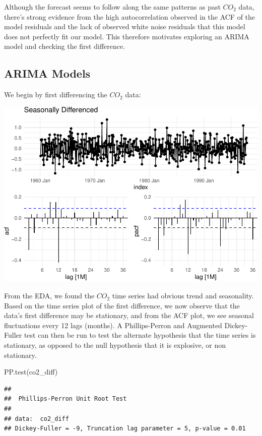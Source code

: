\documentclass[AER]{AEA}
\newenvironment{Shaded}{\begin{snugshade}}{\end{snugshade}}
\newcommand{\FunctionTok}[1]{\textcolor[rgb]{0.00,0.00,0.00}{#1}}
\newcommand{\NormalTok}[1]{#1}
\begin{document}
Although the forecast seems to follow along the same patterns as past
\(CO_2\) data, there's strong evidence from the high autocorrelation
observed in the ACF of the model residuals and the lack of observed
white noise residuals that this model does not perfectly fit our model.
This therefore motivates exploring an ARIMA model and checking the first
difference.

\hypertarget{arima-models}{%
\subsection{ARIMA Models}\label{arima-models}}

We begin by first differencing the \(CO_2\) data:

\includegraphics{co2_1997_Qian_files/figure-latex/unnamed-chunk-2-1.pdf}

From the EDA, we found the \(CO_2\) time series had obvious trend and
seasonality. Based on the time series plot of the first difference, we
now observe that the data's first difference may be stationary, and from
the ACF plot, we see seasonal fluctuations every 12 lags (months). A
Phillips-Perron and Augmented Dickey-Fuller test can then be run to test
the alternate hypothesis that the time series is stationary, as opposed
to the null hypothesis that it is explosive, or non stationary.

\begin{Shaded}
\begin{Highlighting}[]
\FunctionTok{PP.test}\NormalTok{(co2\_diff)}
\end{Highlighting}
\end{Shaded}

\begin{verbatim}
## 
##  Phillips-Perron Unit Root Test
## 
## data:  co2_diff
## Dickey-Fuller = -9, Truncation lag parameter = 5, p-value = 0.01
\end{verbatim}
\end{document}
